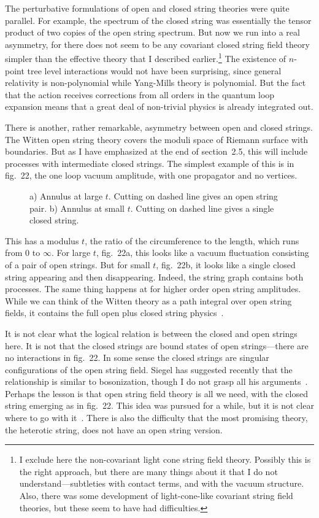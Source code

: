 The perturbative formulations of open and closed string theories were
quite parallel.  For example, the spectrum of the closed
string was essentially the tensor product of two copies of the open
string spectrum.  But now we run into a real asymmetry, for there does
not seem to be any covariant closed string field theory simpler than the
effective theory that I described earlier.\footnote
{I exclude here the non-covariant light cone string field theory.
Possibly this is the right approach, but there are many things about it
that I do not understand---subtleties with contact terms, and with the
vacuum structure.  Also, there was some development of light-cone-like
covariant string field theories, but these seem to have had
difficulties.}
The existence of $n$-point
tree level interactions would not have been surprising, since general
relativity is non-polynomial while Yang-Mills theory is polynomial.
But the fact that the action receives corrections from all orders in
the quantum loop expansion means that a great deal of non-trivial
physics is already integrated out.

There is another, rather remarkable, asymmetry between open and closed
strings.  The Witten open string theory covers the moduli
space of Riemann surface with boundaries.  But as I have emphasized at
the end of section~2.5, this will include processes with intermediate
closed strings.  The simplest example of this is in fig.~22, the
one loop vacuum amplitude, with one propagator and no
vertices.
\begin{figure}
\begin{center}
\leavevmode
{}
\end{center}
\caption[]{a) Annulus at large $t$.  Cutting on dashed line gives an
open string pair. b) Annulus at small $t$.  Cutting on dashed line 
gives a single closed string.}
\end{figure}
This has a modulus $t$, the ratio of the circumference to
the length, which runs from $0$ to $\infty$.
For large $t$,
fig.~22a, this looks like a vacuum fluctuation consisting of a pair
of open strings.  But for small $t$, fig.~22b, it looks like a
single closed string appearing and then disappearing.  Indeed, the
string graph contains both processes.  The same thing happens at for
higher order open string amplitudes.
While we can think of the Witten theory as a path integral over
open string fields, it contains the full open plus closed string
physics~\cite{GMW}.

It is not clear what the logical relation is between the closed and
open strings here.  It is not that the closed strings are bound states
of open strings---there are no interactions in fig.~22.  In some
sense the closed strings are singular configurations of the open
string field.  Siegel has suggested recently that the relationship is
similar to bosonization, though I do not grasp all his
arguments~\cite{Socb}.   Perhaps the lesson is that open string field
theory is all we need, with the closed string emerging as in
fig.~22.  This idea was pursued for a while, but it is
not clear where to go with it~\cite{Scsft}.  There is also the
difficulty that the most promising theory, the heterotic string, 
does not have an open string version.

